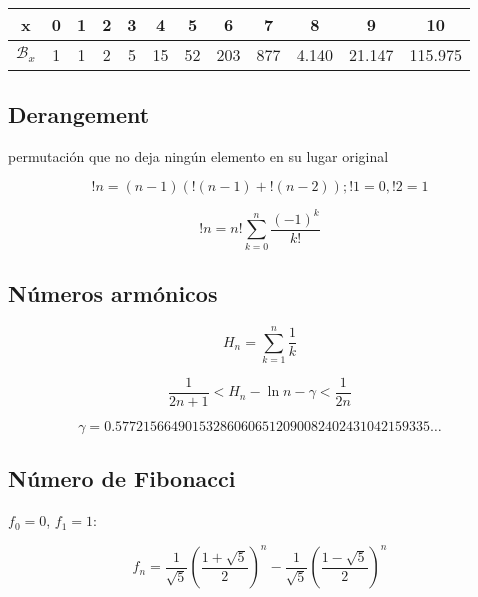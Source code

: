       \

      \begin{tabular}{|c|c|c|c|c|c|c|c|c|c|c|c|}
        \hline
        x&0&1&2&3&4&5&6&7&8&9&10 \\ \hline %
        $\mathcal{B}_x$&1&1&2&5&15&52&203&877&4.140&21.147&115.975 \\ \hline %
      \end{tabular}

      \subsection{Derangement} permutación que no deja ningún elemento en su lugar original

      \begin{equation*}
        !n = (n - 1)( !(n - 1) + !(n - 2) ); !1 = 0, !2 = 1
      \end{equation*}

      \begin{equation*}
        !n = n! \sum_{k = 0}^n \frac{(-1)^k}{k!}
      \end{equation*}

    \subsection{Números armónicos}

    \begin{equation*}
     H_n = \sum_{k = 1}^n \frac{1}{k}
    \end{equation*}

    \begin{equation*}
     \frac{1}{2n+1} < H_n - \ln n - \gamma < \frac{1}{2n}
    \end{equation*}

    \begin{equation*}
     \gamma = 0.57721 56649 01532 86060 65120 90082 40243 10421 59335 \ldots
    \end{equation*}

    \subsection{Número de Fibonacci} $f_0 = 0$, $f_1 = 1$:

    \begin{equation*}
     f_n = \frac{1}{\sqrt{5}}(\frac{1 + \sqrt{5}}{2})^n - \frac{1}{\sqrt{5}}(\frac{1 - \sqrt{5}}{2})^n
    \end{equation*}
    
